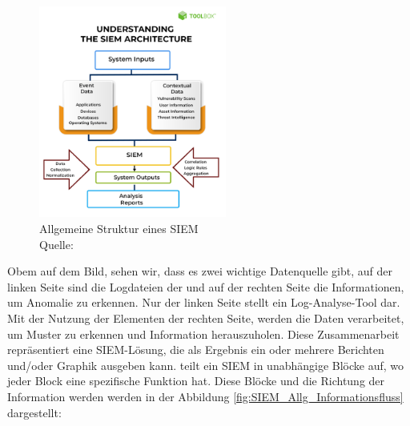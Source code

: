 
\begin{figure}[H]
   \centering
   \includegraphics[width=0.55\textwidth]{assets/2_p1.png}
   \caption[Allgemeine Struktur von \gls{SIEM}]
   {Allgemeine Struktur eines \gls{SIEM}\\Quelle: \citep{Mohanan_What} }
   \label{fig:SIEM_Allg_Struktur}
   \centering
\end{figure}

Obem auf dem Bild, sehen wir, dass es zwei wichtige Datenquelle gibt, auf der linken Seite sind die Logdateien der  und auf der rechten Seite die Informationen, um Anomalie zu erkennen. Nur der linken Seite stellt ein Log-Analyse-Tool dar. Mit der Nutzung der Elementen der rechten Seite, werden die Daten verarbeitet, um Muster zu erkennen und Information herauszuholen. Diese Zusammenarbeit repräsentiert eine \gls{SIEM}-Lösung, die als Ergebnis ein oder mehrere Berichten und/oder Graphik ausgeben kann. \cite{Granadillo_SIEM} teilt ein \gls{SIEM} in unabhängige Blöcke auf, wo jeder Block eine spezifische Funktion hat. Diese Blöcke und die Richtung der Information werden werden in der Abbildung \ref{fig:SIEM_Allg_Informationsfluss} dargestellt:




